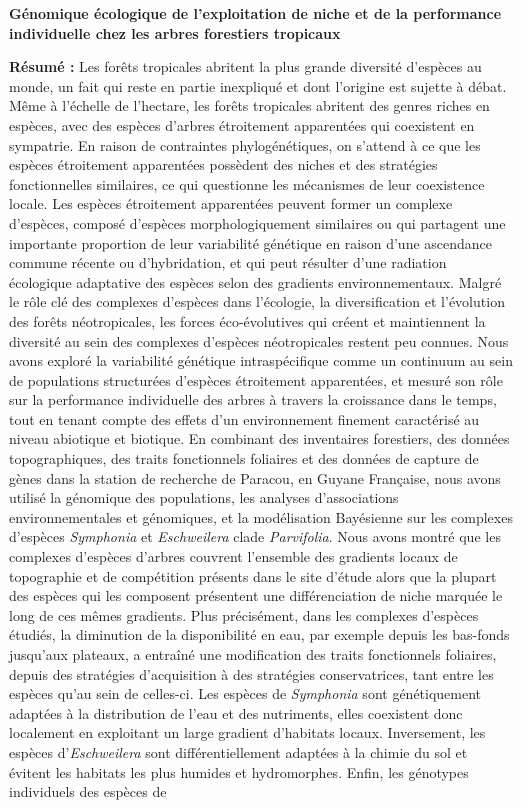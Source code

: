 \newpage
\null\vfill
{\fontsize{7.5}{8}\selectfont
\begin{center}
\textbf{Génomique écologique de l'exploitation de niche et de la performance individuelle chez les arbres forestiers tropicaux} \\
\end{center} 
\textbf{Résumé :}
Les forêts tropicales abritent la plus grande diversité d'espèces au monde, un fait qui reste en partie inexpliqué et dont l'origine est sujette à débat. Même à l'échelle de l'hectare, les forêts tropicales abritent des genres riches en espèces, avec des espèces d’arbres étroitement apparentées qui coexistent en sympatrie. En raison de contraintes phylogénétiques, on s'attend à ce que les espèces étroitement apparentées possèdent des niches et des stratégies fonctionnelles similaires, ce qui questionne les mécanismes de leur coexistence locale. Les espèces étroitement apparentées peuvent former un complexe d'espèces, composé d’espèces morphologiquement similaires ou qui partagent une importante proportion de leur variabilité génétique en raison d'une ascendance commune récente ou d'hybridation, et qui peut résulter d'une radiation écologique adaptative des espèces selon des gradients environnementaux. Malgré le rôle clé des complexes d'espèces dans l'écologie, la diversification et l'évolution des forêts néotropicales, les forces éco-évolutives qui créent et maintiennent la diversité au sein des complexes d'espèces néotropicales restent peu connues. Nous avons exploré la variabilité génétique intraspécifique comme un continuum au sein de populations structurées d'espèces étroitement apparentées, et mesuré son rôle sur la performance individuelle des arbres à travers la croissance dans le temps, tout en tenant compte des effets d'un environnement finement caractérisé au niveau abiotique et biotique. En combinant des inventaires forestiers, des données topographiques, des traits fonctionnels foliaires et des données de capture de gènes dans la station de recherche de Paracou, en Guyane Française, nous avons utilisé la génomique des populations, les analyses d'associations environnementales et génomiques, et la modélisation Bayésienne sur les complexes d'espèces \emph{Symphonia} et \emph{Eschweilera} clade \emph{Parvifolia}. Nous avons montré que les complexes d'espèces d'arbres couvrent l’ensemble des gradients locaux de topographie et de compétition présents dans le site d'étude alors que la plupart des espèces qui les composent présentent une différenciation de niche marquée le long de ces mêmes gradients. Plus précisément, dans les complexes d'espèces étudiés, la diminution de la disponibilité en eau, par exemple depuis les bas-fonds jusqu’aux plateaux, a entraîné une modification des traits fonctionnels foliaires, depuis des stratégies d'acquisition à des stratégies conservatrices, tant entre les espèces qu'au sein de celles-ci. Les espèces de \emph{Symphonia} sont génétiquement adaptées à la distribution de l'eau et des nutriments, elles coexistent donc localement en exploitant un large gradient d'habitats locaux. Inversement, les espèces d'\emph{Eschweilera} sont différentiellement adaptées à la chimie du sol et évitent les habitats les plus humides et hydromorphes. Enfin, les génotypes individuels des espèces de }
